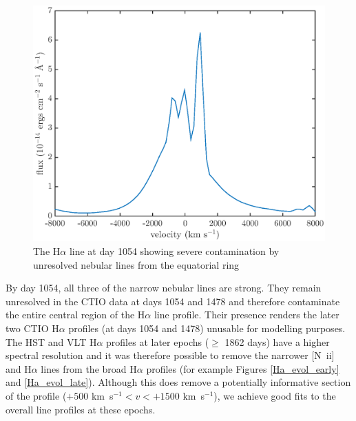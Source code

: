 \documentclass[useAMS,usenatbib,usegraphicx]{mnras}
\begin{document}
 \begin{figure}
\begin{center}
\includegraphics[trim=38 7 35 20,clip=true,scale=0.49]{d1054Ha}
\caption{The H$\alpha$ line at day 1054 showing severe contamination by unresolved nebular lines from the equatorial ring}
\label{d1054}
\end{center}
\end{figure}

 
 By day 1054, all three of the narrow nebular lines are strong.  They remain unresolved in the CTIO data at days 1054 and 1478 and therefore contaminate the entire central region of the H$\alpha$ line profile.  Their presence renders the later two CTIO H$\alpha$ profiles (at days 1054 and 1478) unusable for modelling purposes.  The HST and VLT H$\alpha$ profiles at later epochs ($\ge$ 1862 days) have a higher spectral resolution and it was therefore possible to remove the narrower [N~{\sc ii}] and H$\alpha$ lines from the broad H$\alpha$ profiles (for example Figures \ref{Ha_evol_early} and \ref{Ha_evol_late}). Although this does remove a 
 potentially informative section of the profile ($+500$ km~s$^{-1}<v<+1500$ km~s$^{-1}$), we achieve good fits 
to the overall line profiles at these epochs.




\end{document}
